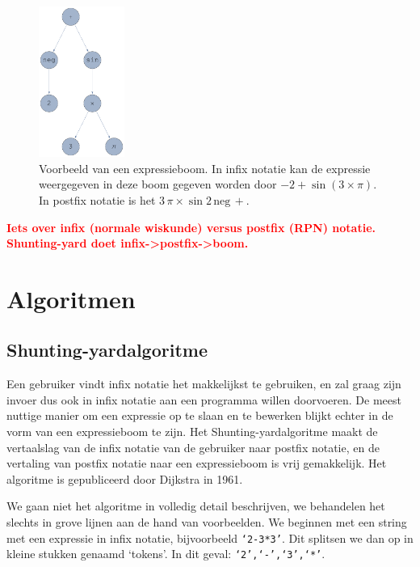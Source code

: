 \documentclass[a4paper]{article}
\newcommand{\rcom}[1]{\textbf{\textcolor{red}{#1}}}
\begin{document}
\begin{figure}[!htb]
	\centering
	\includegraphics[width=0.25\textwidth]{expressionTree}
	\caption{Voorbeeld van een expressieboom. In infix notatie  kan de expressie weergegeven in deze boom gegeven worden door $-2+\sin(3\times \pi)$. In postfix notatie is het $3\,\pi\times\sin 2\, \mathrm{neg}\,+$.}\label{fig:boom}
\end{figure}

\rcom{Iets over infix (normale wiskunde) versus postfix (RPN) notatie. Shunting-yard doet infix->postfix->boom.}

\section{Algoritmen}
\subsection{Shunting-yardalgoritme}
Een gebruiker vindt infix notatie het makkelijkst te gebruiken, en zal graag zijn invoer dus ook in infix notatie aan een programma willen doorvoeren. De meest nuttige manier om een expressie op te slaan en te bewerken blijkt echter in de vorm van een expressieboom te zijn. Het Shunting-yardalgoritme maakt de vertaalslag van de infix notatie van de gebruiker naar postfix notatie, en de vertaling van postfix notatie naar een expressieboom is vrij gemakkelijk. Het algoritme is gepubliceerd door Dijkstra in 1961. 

We gaan niet het algoritme in volledig detail beschrijven, we behandelen het slechts in grove lijnen aan de hand van voorbeelden. We beginnen met een string met een expressie in infix notatie, bijvoorbeeld \texttt{`2-3*3'}. Dit splitsen we dan op in kleine stukken genaamd `tokens'. In dit geval: \texttt{`2',`-',`3',`*'}. 
\end{document}
